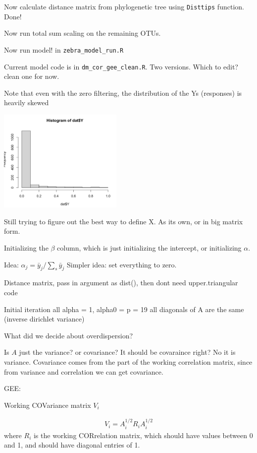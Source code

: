 \documentclass[10pt]{article}
\begin{document}
Now calculate distance matrix from phylogenetic tree using \texttt{Disttips} function. Done!


Now run total sum scaling on the remaining OTUs.

Now run model! in \texttt{zebra\_model\_run.R}

Current model code is in \texttt{dm\_cor\_gee\_clean.R}. Two versions. Which to edit? clean one for now.

Note that even with the zero filtering, the distribution of the Ys (responses) is heavily skewed

\includegraphics[width=0.45\textwidth]{img/Progress_Report-ce0570ff.png}

Still trying to figure out the best way to define X. As its own, or in big matrix form.


Initializing the $\beta$ column, which is just initializing the intercept, or initializing $\alpha$.

Idea: $\alpha_j = \bar y_j/ \sum_s \bar y_j$
Simpler idea: set everything to zero.

Distance matrix, pass in argument as dist(), then dont need upper.triangular code

Initial iteration
all alpha = 1, alpha0 = p = 19
all diagonals of A are the same (inverse dirichlet variance)

What did we decide about overdispersion?

Is $A$ just the variance? or covariance? It should be covaraince right? No it is variance. Covariance comes from the part of the working correlation matrix, since from variance and correlation we can get covariance.


GEE:

Working COVariance matrix $V_i$

\begin{align*}
  V_i = A_i^{1/2}R_i A_i^{1/2}
\end{align*}
where $R_i$ is the working CORrelation matrix, which should have values between 0 and 1, and should have diagonal entries of 1.
\end{document}
